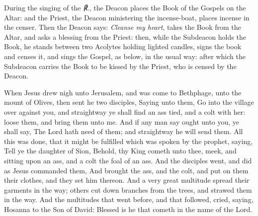 \begin{rubric}
    During the singing of the \emph{℟.}, the Deacon places the Book of the Gospels on the Altar: and the Priest, the Deacon ministering the incense-boat, places incense in the censer. Then the Deacon says: \emph{Cleanse my heart}, takes the Book from the Altar, and asks a blessing from the Priest: then, while the Subdeacon holds the Book, he stands between two Acolytes holding lighted candles, signs the book and censes it, and sings the Gospel, as below, in the usual way: after which the Subdeacon carries the Book to be kissed by the Priest, who is censed by the Deacon.
\end{rubric}
 When Jesus drew nigh unto Jerusalem, and was come to Bethphage, unto the mount of Olives, then sent he two disciples, Saying unto them, Go into the village over against you, and straightway ye shall find an ass tied, and a colt with her: loose them, and bring them unto me. And if any man say ought unto you, ye shall say, The Lord hath need of them; and straightway he will send them. All this was done, that it might be fulfilled which was spoken by the prophet, saying, Tell ye the daughter of Sion, Behold, thy King cometh unto thee, meek, and sitting upon an ass, and a colt the foal of an ass. And the disciples went, and did as Jesus commanded them, And brought the ass, and the colt, and put on them their clothes, and they set him thereon. And a very great multitude spread their garments in the way; others cut down branches from the trees, and strawed them in the way. And the multitudes that went before, and that followed, cried, saying, Hosanna to the Son of David: Blessed is he that cometh in the name of the Lord.
